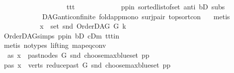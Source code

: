 \begin{isabellebody}
\ \ \ \ \ \ \ \ \ \ \ \ \ \ \ \ \ \ \ ttt{\isacharparenright}{\kern0pt}{\isacharparenright}{\kern0pt}{\isachardoublequoteclose}\ \isanewline
\ \ \ \ \ \ \ \ \ \ \isamarkupfalse%
\ pp{\isacharunderscore}{\kern0pt}in\ sorted{\isacharunderscore}{\kern0pt}list{\isacharunderscore}{\kern0pt}of{\isacharunderscore}{\kern0pt}set{\isacharparenleft}{\kern0pt}{}{\isacharparenright}{\kern0pt}\ anti\ bD\ subs\isanewline
\ \ \ \ \ \ \ \ \ \ \ \ DAG{\isachardot}{\kern0pt}anticon{\isacharunderscore}{\kern0pt}finite\ fold{\isacharunderscore}{\kern0pt}app{\isacharunderscore}{\kern0pt}mono{}\ surj{\isacharunderscore}{\kern0pt}pair\ top{\isacharunderscore}{\kern0pt}sort{\isacharunderscore}{\kern0pt}con\ \ \isamarkupfalse%
\ metis\ \isanewline
\ \ \ \ \ \ \ \ \isamarkupfalse%
\ \isamarkupfalse%
\ {\isachardoublequoteopen}x\ {\isasymin}\ set\ {\isacharparenleft}{\kern0pt}snd\ {\isacharparenleft}{\kern0pt}OrderDAG\ G\ k{\isacharparenright}{\kern0pt}{\isacharparenright}{\kern0pt}{\isachardoublequoteclose}\ \isamarkupfalse%
\ OrderDAG{\isachardot}{\kern0pt}simps\ pp{\isacharunderscore}{\kern0pt}in\ bD\ cDm\ ttt{\isacharunderscore}{\kern0pt}in\ {}\isanewline
\ \ \ \ \ \ \ \ \ \ \isamarkupfalse%
\ {\isacharparenleft}{\kern0pt}metis\ {\isacharparenleft}{\kern0pt}no{\isacharunderscore}{\kern0pt}types{\isacharcomma}{\kern0pt}\ lifting{\isacharparenright}{\kern0pt}\ map{\isacharunderscore}{\kern0pt}eq{\isacharunderscore}{\kern0pt}conv{\isacharparenright}{\kern0pt}\ \isanewline
\ \ \ \ \ \ \isamarkupfalse%
\ \isanewline
\ \ \ \ \ \ \ \ \isamarkupfalse%
\ \ as{}{\isacharcolon}{\kern0pt}\ {\isachardoublequoteopen}x\ {\isasymin}\ past{\isacharunderscore}{\kern0pt}nodes\ G\ {\isacharparenleft}{\kern0pt}snd\ {\isacharparenleft}{\kern0pt}choose{\isacharunderscore}{\kern0pt}max{\isacharunderscore}{\kern0pt}blue{\isacharunderscore}{\kern0pt}set\ pp{\isacharparenright}{\kern0pt}{\isacharparenright}{\kern0pt}{\isachardoublequoteclose}\isanewline
\ \ \ \ \ \ \ \ \isamarkupfalse%
\ \isamarkupfalse%
\ pas{\isacharcolon}{\kern0pt}\ {\isachardoublequoteopen}x\ {\isasymin}\ verts\ {\isacharparenleft}{\kern0pt}reduce{\isacharunderscore}{\kern0pt}past\ G\ {\isacharparenleft}{\kern0pt}snd\ {\isacharparenleft}{\kern0pt}choose{\isacharunderscore}{\kern0pt}max{\isacharunderscore}{\kern0pt}blue{\isacharunderscore}{\kern0pt}set\ pp{\isacharparenright}{\kern0pt}{\isacharparenright}{\kern0pt}{\isacharparenright}{\kern0pt}{\isachardoublequoteclose}\ \isanewline

\end{isabellebody}
